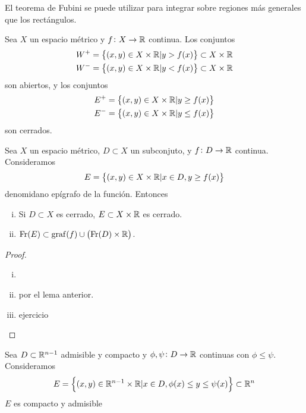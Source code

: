 El teorema de Fubini se puede utilizar para integrar sobre regiones más generales que
los rectángulos.

\begin{lema}
    Sea $X$ un espacio m\'etrico y $f \colon X \to \mathbb{R}$ continua. Los conjuntos
    \begin{gather*}
        W^+ = \left\{(x, y) \in X \times \mathbb{R} \vert y > f(x)\right\} \subset X \times \mathbb{R} \\
        W^- = \left\{(x, y) \in X \times \mathbb{R} \vert y < f(x)\right\} \subset X \times \mathbb{R}
    \end{gather*}
    son abiertos, y los conjuntos
    \begin{gather*}
        E^+ = \left\{(x, y) \in X \times \mathbb{R} \vert y \geq f(x)\right\} \\
        E^- = \left\{(x, y) \in X \times \mathbb{R} \vert y \leq f(x)\right\}
    \end{gather*}
    son cerrados.
\end{lema}
\begin{lema}
    Sea $X$ un espacio m\'etrico, $D \subset X$ un subconjuto, y $f \colon D \to \mathbb{R}$
    continua. Consideramos
    \[
        E = \left\{(x, y) \in X \times \mathbb{R} \vert x \in D, y \geq f(x)\right\}
    \]
    denomidano epígrafo de la función. Entonces
    \begin{enumerate}[i)]
        \item Si $D \subset X$ es cerrado, $E \subset X \times \mathbb{R}$ es cerrado.
        \item $\operatorname{Fr}(E) \subset \operatorname{graf}(f) \cup \left( \operatorname{Fr}(D) \times \mathbb{R} \right)$.
    \end{enumerate}
\end{lema}
\begin{proof}
    \begin{enumerate}[i)]
        \item[]
        \item por el lema anterior.
        \item ejercicio
    \end{enumerate}
\end{proof}

\begin{lema}
    Sea $D \subset \mathbb{R}^{n-1}$ admisible y compacto y $\phi, \psi \colon D \to \mathbb{R}$
    continuas con $\phi \leq \psi$. Consideramos
    \[
        E = \left\{(x, y) \in \mathbb{R}^{n-1} \times \mathbb{R} \vert x \in D,
        \phi(x) \leq y \leq \psi(x)\right\} \subset \mathbb{R}^n
    \]
    $E$ es compacto y admisible
\end{lema}

